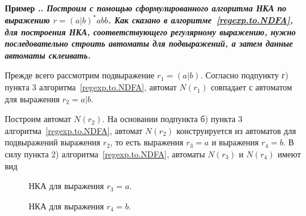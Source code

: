 \documentclass[10pt]{report}
\newcounter{exam}[section]
\renewcommand{\theexam}{\thesection.\arabic{exam}}
\newenvironment{Example}{\par\refstepcounter{exam}\bf Пример \theexam. \sl}{\rm\par}
\begin{document}
\begin{Example} Построим с помощью сформулированного алгоритма НКА по выражению $r=(a|b)^*abb$. Как сказано в алгоритме~\ref{regexp.to.NDFA}, для построения НКА, соответствующего регулярному
выражению, нужно последовательно строить автоматы для подвыражений, а затем данные автоматы склеивать.

Прежде всего рассмотрим подвыражение $r_1=(a|b)$. Согласно подпункту г) пункта 3 алгоритма~\ref{regexp.to.NDFA}, автомат $N(r_1)$ совпадает с автоматом для выражения $r_2=a|b$.

Построим автомат $N(r_2)$. На основании подпункта б) пункта 3 алгоритма~\ref{regexp.to.NDFA}, автомат $N(r_2)$ конструируется из автоматов для подвыражений выражения $r_2$, то есть
выражения $r_3=a$ и выражения $r_4=b$. В силу пункта 2) алгоритма~\ref{regexp.to.NDFA}, автоматы $N(r_3)$ и $N(r_4)$ имеют вид
\begin{figure}[!h]
\centering
{}
  \caption{НКА для выражения $r_3=a$.}\label{NDFA.diagramm.for.N(r3=a)}
\end{figure}
\newpage
\begin{figure}[!h]
\centering
{}
  \caption{НКА для выражения $r_4=b$.}\label{NDFA.diagramm.for.N(r4=b)}
\end{figure}


\end{Example}
\end{document}
